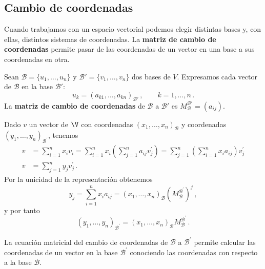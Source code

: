 \subsection{Cambio de coordenadas}

Cuando trabajamos con un espacio vectorial podemos elegir distintas bases y, con ellas, distintos sistemas de coordenadas. La \textbf{matriz de cambio de coordenadas} permite pasar de las coordenadas de un vector en una base a sus coordenadas en otra.

\begin{defi}
  Sean $\mathcal{B}=\{u_1,\ldots,u_n\}$ y $\mathcal{B}'=\{v_1,\ldots,v_n\}$ dos bases de $V$. Expresamos cada vector de $\mathcal{B}$ en la base $\mathcal{B}'$:
  \[
    u_k = (a_{k1},\ldots,a_{kn})_{\mathcal{B}'}\,,\qquad k=1,\ldots,n\,.
  \]
  La \textbf{matriz de cambio de coordenadas} de $\mathcal{B}$ a $\mathcal{B}'$ es $M_{\mathcal{B}}^{\mathcal{B}'}=(a_{ij})$.
\end{defi}

Dado $v$ un vector de $\V$ con coordenadas $(x_1,\dots,x_n)_{\mathcal{B}}$ y coordenadas $(y_1,\dots,y_n)_{\mathcal{B}^\prime}$, tenemos
\begin{align*}
  v & =\sum_{i=1}^n x_i v_i=\sum_{i=1}^n x_i \left( \sum_{j=1}^n a_{ij}v_j^\prime\right) =\sum_{j=1}^n \left( \sum_{i=1}^n x_i a_{ij}\right) v_j^\prime \\
  v & =\sum_{j=1}^n y_j v_j^\prime\,.
\end{align*}
Por la unicidad de la representación obtenemos
\[
  y_j                                  = \sum_{i=1}^n x_i a_{ij} = (x_1,\dots,x_n)_{\mathcal{B}}(M_{\mathcal{B}}^{\mathcal{B}^\prime})^j\,,
\]
y por tanto
\[
  (y_1,\dots,y_n)_{\mathcal{B}^\prime} = (x_1,\dots,x_n)_{\mathcal{B}}M_{\mathcal{B}}^{\mathcal{B}^\prime}\,.
\]

La ecuación matricial del cambio de coordenadas de $\mathcal{B}$ a $\mathcal{B}^\prime$ permite calcular las coordenadas de un vector en la base $\mathcal{B}^\prime$ conociendo las coordenadas con respecto a la base $\mathcal{B}$.

